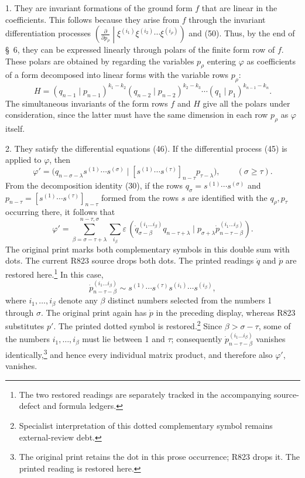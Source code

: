 \documentclass[10pt]{article}
\newcommand{\pair}[2]{(#1\mid #2)}
\newcommand{\eps}{\varepsilon}
\begin{document}
1. They are invariant formations of the ground form $f$ that are linear in
the coefficients. This follows because they arise from $f$ through the
invariant differentiation processes
$\left(\frac{\partial}{\partial p_\rho}\middle|
\xi^{(i_1)}\xi^{(i_2)}\cdots\xi^{(i_\rho)}\right)$ and (50). Thus, by the end
of \S\ 6, they can be expressed linearly through polars of the finite form
row of $f$. These polars are obtained by regarding the variables $p_\rho$
entering $\varphi$ as coefficients of a form decomposed into linear forms
with the variable rows $p_\rho$:
\begin{equation}
 H=(q_{n-1}\mid p_{n-1})^{k_1-k_2}
 (q_{n-2}\mid p_{n-2})^{k_2-k_3}\cdots
 (q_1\mid p_1)^{k_{n-1}-k_n}.
\tag{52}
\end{equation}
The simultaneous invariants of the form rows $f$ and $H$ give all the polars
under consideration, since the latter must have the same dimension in each
row $p_\rho$ as $\varphi$ itself.

2. They satisfy the differential equations (46). If the differential
process (45) is applied to $\varphi$, then
\[
 \varphi'=\bigl(q_{n-\sigma-\lambda}s^{(1)}\cdots s^{(\sigma)}
 \mid [s^{(1)}\cdots s^{(\tau)}]_{n-\tau}p_{\tau-\lambda}\bigr),
 \qquad(\sigma\geq\tau).
\]
From the decomposition identity (30), if the rows
$q_\sigma=s^{(1)}\cdots s^{(\sigma)}$ and
$p_{n-\tau}=[s^{(1)}\cdots s^{(\tau)}]_{n-\tau}$ formed from the rows $s$
are identified with the $q_\rho,p_\tau$ occurring there, it follows that
\[
 \varphi'=\sum_{\beta=\sigma-\tau+\lambda}^{n-\tau,\sigma}
 \sum_{i_\beta}\eps\,
 \pair{\dot{q}_{\sigma-\beta}^{(i_1\ldots i_\beta)}
 q_{n-\tau+\lambda}}
 {p_{\sigma+\lambda}
 \dot{p}_{n-\tau-\beta}^{(i_1\ldots i_\beta)}}.
\]
The original print marks both complementary symbols in this double sum with
dots. The current R823 source drops both dots. The printed readings
$\dot q$ and $\dot p$ are restored here.\footnote{The two restored
readings are separately tracked in the accompanying source-defect and
formula ledgers.}
In this case,
\[
 \dot{p}_{n-\tau-\beta}^{(i_1\ldots i_\beta)}
 \sim s^{(1)}\cdots s^{(\tau)}s^{(i_1)}\cdots s^{(i_\beta)},
\]
where $i_1,\ldots,i_\beta$ denote any $\beta$ distinct numbers selected from
the numbers 1 through $\sigma$. The original print again has $\dot p$ in the
preceding display, whereas R823 substitutes $p'$. The printed dotted symbol
is restored.\footnote{Specialist interpretation of this dotted
complementary symbol remains external-review debt.} Since
$\beta>\sigma-\tau$, some of the numbers
$i_1,\ldots,i_\beta$ must lie between 1 and $\tau$; consequently
$\dot{p}_{n-\tau-\beta}^{(i_1\ldots i_\beta)}$ vanishes
identically,\footnote{The original print retains the dot in this prose
occurrence; R823 drops it. The printed reading is restored here.} and hence
every individual matrix product, and therefore
also $\varphi'$, vanishes.
\end{document}
